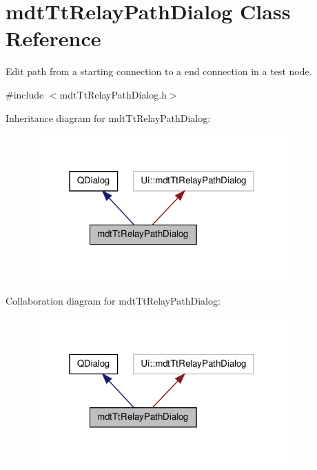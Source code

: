 \hypertarget{classmdt_tt_relay_path_dialog}{\section{mdt\-Tt\-Relay\-Path\-Dialog Class Reference}
\label{classmdt_tt_relay_path_dialog}
}


Edit path from a starting connection to a end connection in a test node.  




{\ttfamily \#include $<$mdt\-Tt\-Relay\-Path\-Dialog.\-h$>$}



Inheritance diagram for mdt\-Tt\-Relay\-Path\-Dialog\-:\nopagebreak
\begin{figure}[H]
\begin{center}
\leavevmode
\includegraphics[width=280pt]{classmdt_tt_relay_path_dialog__inherit__graph}
\end{center}
\end{figure}


Collaboration diagram for mdt\-Tt\-Relay\-Path\-Dialog\-:\nopagebreak
\begin{figure}[H]
\begin{center}
\leavevmode
\includegraphics[width=280pt]{classmdt_tt_relay_path_dialog__coll__graph}
\end{center}
\end{figure}
